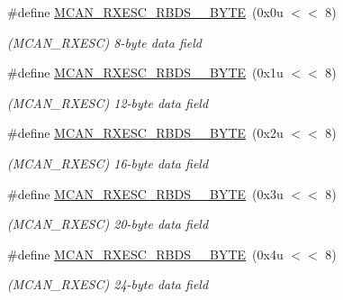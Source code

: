 \begin{DoxyCompactItemize}
\#define \mbox{\hyperlink{group__SAME70__MCAN_ga608dbb54cc832ce1f35d6d4d73be5c50}{M\+C\+A\+N\+\_\+\+R\+X\+E\+S\+C\+\_\+\+R\+B\+D\+S\+\_\+\_\+\+B\+Y\+TE}}~(0x0u $<$$<$ 8)
\begin{DoxyCompactList}\small\item\em (M\+C\+A\+N\+\_\+\+R\+X\+E\+SC) 8-\/byte data field \end{DoxyCompactList}\item 
\mbox{\label{group__SAME70__MCAN_gadba205db73380d75a038de231a2df2c0}} 
\#define \mbox{\hyperlink{group__SAME70__MCAN_gadba205db73380d75a038de231a2df2c0}{M\+C\+A\+N\+\_\+\+R\+X\+E\+S\+C\+\_\+\+R\+B\+D\+S\+\_\+\_\+\+B\+Y\+TE}}~(0x1u $<$$<$ 8)
\begin{DoxyCompactList}\small\item\em (M\+C\+A\+N\+\_\+\+R\+X\+E\+SC) 12-\/byte data field \end{DoxyCompactList}\item 
\mbox{\label{group__SAME70__MCAN_ga064d0acb73c2d495a75ecb233d58a4d3}} 
\#define \mbox{\hyperlink{group__SAME70__MCAN_ga064d0acb73c2d495a75ecb233d58a4d3}{M\+C\+A\+N\+\_\+\+R\+X\+E\+S\+C\+\_\+\+R\+B\+D\+S\+\_\+\_\+\+B\+Y\+TE}}~(0x2u $<$$<$ 8)
\begin{DoxyCompactList}\small\item\em (M\+C\+A\+N\+\_\+\+R\+X\+E\+SC) 16-\/byte data field \end{DoxyCompactList}\item 
\mbox{\label{group__SAME70__MCAN_gadab96a3ae414786529d36ccff74ad6cb}} 
\#define \mbox{\hyperlink{group__SAME70__MCAN_gadab96a3ae414786529d36ccff74ad6cb}{M\+C\+A\+N\+\_\+\+R\+X\+E\+S\+C\+\_\+\+R\+B\+D\+S\+\_\+\_\+\+B\+Y\+TE}}~(0x3u $<$$<$ 8)
\begin{DoxyCompactList}\small\item\em (M\+C\+A\+N\+\_\+\+R\+X\+E\+SC) 20-\/byte data field \end{DoxyCompactList}\item 
\mbox{\label{group__SAME70__MCAN_ga12bb544ff954ac1a63924f9c1b4de0e1}} 
\#define \mbox{\hyperlink{group__SAME70__MCAN_ga12bb544ff954ac1a63924f9c1b4de0e1}{M\+C\+A\+N\+\_\+\+R\+X\+E\+S\+C\+\_\+\+R\+B\+D\+S\+\_\+\_\+\+B\+Y\+TE}}~(0x4u $<$$<$ 8)
\begin{DoxyCompactList}\small\item\em (M\+C\+A\+N\+\_\+\+R\+X\+E\+SC) 24-\/byte data field \end{DoxyCompactList}\item 
$$
\end{DoxyCompactItemize}
